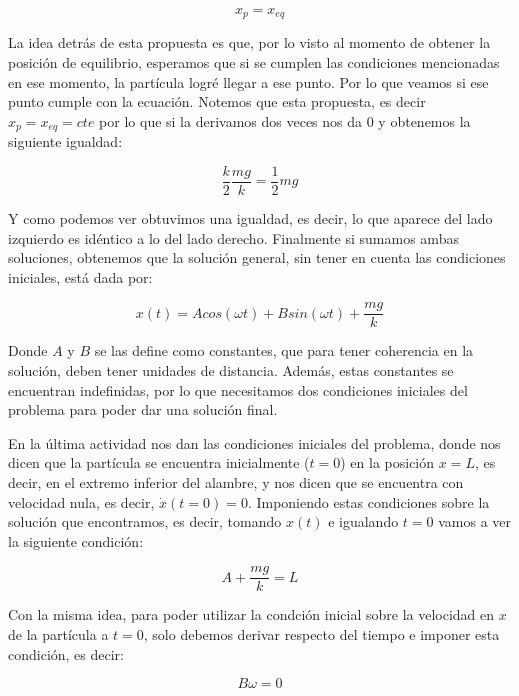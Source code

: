 \documentclass{article}
\begin{document}
\begin{multicols}{2}
\begin{equation}
    x_p = x_{eq}
\end{equation}

La idea detrás de esta propuesta es que, por lo visto al momento de obtener la posición de equilibrio, esperamos que si se cumplen las condiciones mencionadas en ese momento, la partícula logré llegar a ese punto. Por lo que veamos si ese punto cumple con la ecuación. Notemos que esta propuesta, es decir $x_p = x_{eq} = cte$ por lo que si la derivamos dos veces nos da $0$ y obtenemos la siguiente igualdad:

\begin{equation}
    \frac{k}{2} \frac{mg}{k} = \frac{1}{2}mg
\end{equation}

Y como podemos ver obtuvimos una igualdad, es decir, lo que aparece del lado izquierdo es idéntico a lo del lado derecho. Finalmente si sumamos ambas soluciones, obtenemos que la solución general, sin tener en cuenta las condiciones iniciales, está dada por:

\begin{equation}
    x(t) = Acos(\omega t) + Bsin(\omega t) + \frac{mg}{k}
\end{equation}

Donde $A$ y $B$ se las define como constantes, que para tener coherencia en la solución, deben tener unidades de distancia. Además, estas constantes se encuentran indefinidas, por lo que necesitamos dos condiciones iniciales del problema para poder dar una solución final.

En la última actividad nos dan las condiciones iniciales del problema, donde nos dicen que la partícula se encuentra inicialmente ($t = 0$) en la posición $x = L$, es decir, en el extremo inferior del alambre, y nos dicen que se encuentra con velocidad nula, es decir, $\dot{x}(t = 0) = 0$. Imponiendo estas condiciones sobre la solución que encontramos, es decir, tomando $x(t)$ e igualando $t = 0$ vamos a ver la siguiente condición:

\begin{equation}
    A + \frac{mg}{k} = L
\end{equation}

Con la misma idea, para poder utilizar la condción inicial sobre la velocidad en $x$ de la partícula a $t= 0$, solo debemos derivar respecto del tiempo e imponer esta condición, es decir:

\begin{equation}
    B\omega = 0
\end{equation}


\end{multicols}
\end{document}
